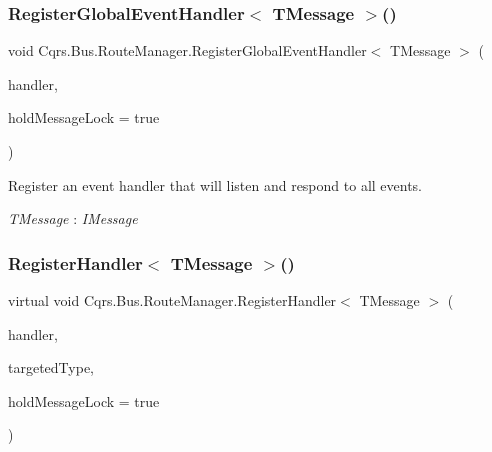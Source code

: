 \mbox{\label{classCqrs_1_1Bus_1_1RouteManager_a1f8fb95b11955aa0762a76f9b39233ec_a1f8fb95b11955aa0762a76f9b39233ec}} 
\subsubsection{\texorpdfstring{Register\+Global\+Event\+Handler$<$ T\+Message $>$()}{RegisterGlobalEventHandler< TMessage >()}}
{\footnotesize\ttfamily void Cqrs.\+Bus.\+Route\+Manager.\+Register\+Global\+Event\+Handler$<$ T\+Message $>$ (\begin{DoxyParamCaption}\item[{Action$<$ T\+Message $>$}]{handler,  }\item[{bool}]{hold\+Message\+Lock = {\ttfamily true} }\end{DoxyParamCaption})}



Register an event handler that will listen and respond to all events. 

\begin{Desc}
\item[Type Constraints]\begin{description}
\item[{\em T\+Message} : {\em I\+Message}]\end{description}
\end{Desc}
\mbox{\label{classCqrs_1_1Bus_1_1RouteManager_a5a01e8a6c9ae6311bca2d9e5cb75a7b9_a5a01e8a6c9ae6311bca2d9e5cb75a7b9}} 
\subsubsection{\texorpdfstring{Register\+Handler$<$ T\+Message $>$()}{RegisterHandler< TMessage >()}\hspace{0.1cm}{\footnotesize\ttfamily [1/2]}}
{\footnotesize\ttfamily virtual void Cqrs.\+Bus.\+Route\+Manager.\+Register\+Handler$<$ T\+Message $>$ (\begin{DoxyParamCaption}\item[{Action$<$ T\+Message $>$}]{handler,  }\item[{Type}]{targeted\+Type,  }\item[{bool}]{hold\+Message\+Lock = {\ttfamily true} }\end{DoxyParamCaption})\hspace{0.3cm}{\ttfamily [virtual]}}



